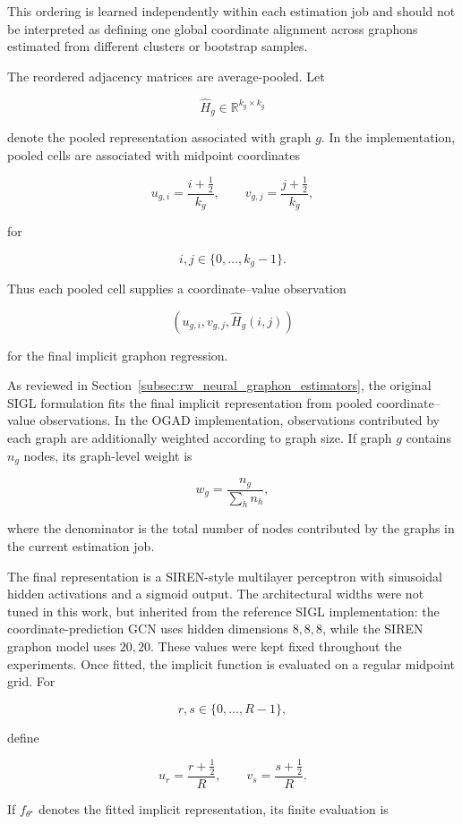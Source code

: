 This ordering is learned independently within each estimation job and should not be interpreted as defining one global coordinate alignment across graphons estimated from different clusters or bootstrap samples.

The reordered adjacency matrices are average-pooled. Let

\[
\widehat{H}_g
\in
\mathbb{R}^{k_g\times k_g}
\]

denote the pooled representation associated with graph \(g\). In the implementation, pooled cells are associated with midpoint coordinates

\[
u_{g,i}
=
\frac{i+\tfrac{1}{2}}{k_g},
\qquad
v_{g,j}
=
\frac{j+\tfrac{1}{2}}{k_g},
\]

for

\[
i,j\in\{0,\ldots,k_g-1\}.
\]

Thus each pooled cell supplies a coordinate--value observation

\[
\left(
u_{g,i},
v_{g,j},
\widehat{H}_g(i,j)
\right)
\]

for the final implicit graphon regression.

As reviewed in Section~\ref{subsec:rw_neural_graphon_estimators}, the original SIGL formulation fits the final implicit representation from pooled coordinate--value observations. In the OGAD implementation, observations contributed by each graph are additionally weighted according to graph size. If graph \(g\) contains \(n_g\) nodes, its graph-level weight is

\[
w_g
=
\frac{n_g}
{\sum_h n_h},
\]

where the denominator is the total number of nodes contributed by the graphs in the current estimation job.

The final representation is a SIREN-style multilayer perceptron with sinusoidal hidden activations \cite{sitzmann2020implicit} and a sigmoid output. The architectural widths were not tuned in this work, but inherited from the reference SIGL implementation: the coordinate-prediction GCN uses hidden dimensions \(8,8,8\), while the SIREN graphon model uses \(20,20\). These values were kept fixed throughout the experiments.
Once fitted, the implicit function is evaluated on a regular midpoint grid. For

\[
r,s\in\{0,\ldots,R-1\},
\]

define

\[
u_r
=
\frac{r+\tfrac{1}{2}}{R},
\qquad
v_s
=
\frac{s+\tfrac{1}{2}}{R}.
\]

If \(f_{\theta^\star}\) denotes the fitted implicit representation, its finite evaluation is

